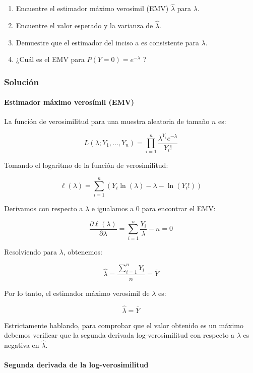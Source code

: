 \documentclass[
]{article}
\providecommand{\tightlist}{%
  \setlength{\itemsep}{0pt}\setlength{\parskip}{0pt}}
\begin{document}
\begin{enumerate}
\def\labelenumi{\arabic{enumi}.}
\tightlist
\item
  Encuentre el estimador máximo verosímil (EMV) \(\hat{\lambda}\) para \(\lambda\).
\item
  Encuentre el valor esperado y la varianza de \(\hat{\lambda}\).
\item
  Demuestre que el estimador del inciso a es consistente para \(\lambda\).
\item
  ¿Cuál es el EMV para \(P(Y=0)=e^{-\lambda}\) ?
\end{enumerate}

\subsubsection{Solución}\label{soluciuxf3n-15}

\paragraph{Estimador máximo verosímil (EMV)}\label{estimador-muxe1ximo-verosuxedmil-emv}

La función de verosimilitud para una muestra aleatoria de tamaño \(n\) es:

\[
L(\lambda; Y_1, \ldots, Y_n) = \prod_{i=1}^n \frac{\lambda^{Y_i} e^{-\lambda}}{Y_i!}
\]

Tomando el logaritmo de la función de verosimilitud:

\[
\ell(\lambda) = \sum_{i=1}^n \left(Y_i \ln(\lambda) - \lambda - \ln(Y_i!)\right)
\]

Derivamos con respecto a \(\lambda\) e igualamos a 0 para encontrar el EMV:

\[
\frac{\partial \ell(\lambda)}{\partial \lambda} = \sum_{i=1}^n \frac{Y_i}{\lambda} - n = 0
\]

Resolviendo para \(\lambda\), obtenemos:

\[
\hat{\lambda} = \frac{\sum_{i=1}^n Y_i}{n} = \overline{Y}
\]

Por lo tanto, el estimador máximo verosímil de \(\lambda\) es:

\[
\hat{\lambda} = \overline{Y}
\]

Estrictamente hablando, para comprobar que el valor obtenido es un máximo debemos verificar que la segunda derivada log-verosimilitud con respecto a \(\lambda\) es negativa en \(\hat{\lambda}\).

\paragraph{Segunda derivada de la log-verosimilitud}\label{segunda-derivada-de-la-log-verosimilitud}
\end{document}
